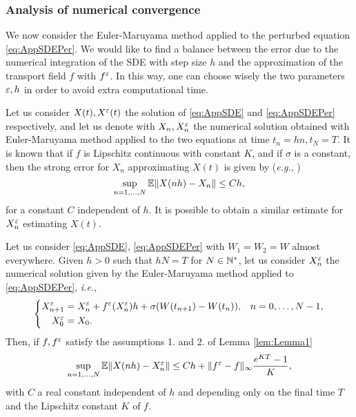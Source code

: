 \subsubsection{Analysis of numerical convergence}

We now consider the Euler-Maruyama method applied to the perturbed equation \eqref{eq:AppSDEPer}. We would like to find a balance between the error due to the numerical integration of the SDE with step size $h$ and the approximation of the transport field $f$ with $f^\varepsilon$. In this way, one can choose wisely the two parameters $\varepsilon, h$ in order to avoid extra computational time.

\noindent Let us consider $X(t), X^\varepsilon(t)$ the solution of \eqref{eq:AppSDE} and \eqref{eq:AppSDEPer} respectively, and let us denote with $X_n, X_n^\varepsilon$ the numerical solution obtained with Euler-Maruyama method applied to the two equations at time $t_n = hn, t_N = T$. It is known that if $f$ is Lipschitz continuous with constant $K$, and if $\sigma$ is a constant, then the strong error for $X_n$ approximating $X(t)$ is given by (\textit{e.g.}, \cite[Chapter 10]{Kloeden1992})
\begin{equation}\label{eq:StrongEM}
	\sup_{n = 1, \dots, N} \mathbb{E} \|X(nh) - X_n\| \leq C h,
\end{equation}
for a constant $C$ independent of $h$. It is possible to obtain a similar estimate for $X_n^\varepsilon$ estimating $X(t)$. 
\begin{theorem}\label{thm:StrongConv} Let us consider \eqref{eq:AppSDE}, \eqref{eq:AppSDEPer} with $W_1 = W_2 = W$ almost everywhere. Given $h > 0$ such that $hN = T$ for $N \in \mathbb{N}^*$, let us consider $X_n^\varepsilon$ the numerical solution given by the Euler-Maruyama method applied to \eqref{eq:AppSDEPer}, \textit{i.e.},
\begin{equation*}
\left \{
\begin{aligned}
	X^\varepsilon_{n+1} &= X^\varepsilon_n + f^\varepsilon(X^\varepsilon_n)h + \sigma (W(t_{n+1}) - W(t_n)), && n = 0, \dots, N - 1, \\
	X^\varepsilon_0 &= X_0.
\end{aligned} \right .
\end{equation*}
Then, if $f, f^\varepsilon$ satisfy the assumptions 1. and 2. of Lemma \ref{lem:Lemma1}
\begin{equation}\label{eq:StrongConvEpl}
	\sup_{n = 1, \dots, N} \mathbb{E} \|X(nh) - X^\varepsilon_n\| \leq C h +  \|f^\varepsilon - f\|_{\infty} \frac{e^{KT} - 1}{K}, 
\end{equation}
with $C$ a real constant independent of $h$ and depending only on the final time $T$ and the Lipschitz constant $K$ of $f$.
\end{theorem}

